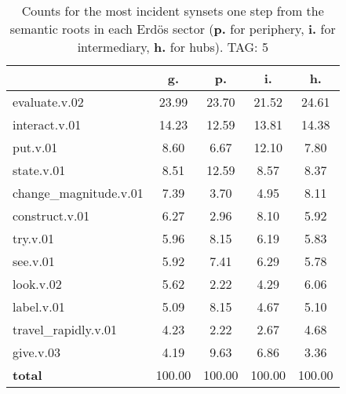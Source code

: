 \begin{table}[h!]
\begin{center}
\begin{tabular}{| l || c | c | c | c |}\hline
 & {\bf g.} & {\bf p.} & {\bf i.} & {\bf h.} \\\hline\hline
evaluate.v.02 & 23.99  & 23.70  & 21.52  & 24.61 \\\hline
interact.v.01 & 14.23  & 12.59  & 13.81  & 14.38 \\\hline
put.v.01 & 8.60  & 6.67  & 12.10  & 7.80 \\\hline
state.v.01 & 8.51  & 12.59  & 8.57  & 8.37 \\\hline
change\_magnitude.v.01 & 7.39  & 3.70  & 4.95  & 8.11 \\\hline
construct.v.01 & 6.27  & 2.96  & 8.10  & 5.92 \\\hline
try.v.01 & 5.96  & 8.15  & 6.19  & 5.83 \\\hline
see.v.01 & 5.92  & 7.41  & 6.29  & 5.78 \\\hline
look.v.02 & 5.62  & 2.22  & 4.29  & 6.06 \\\hline
label.v.01 & 5.09  & 8.15  & 4.67  & 5.10 \\\hline
travel\_rapidly.v.01 & 4.23  & 2.22  & 2.67  & 4.68 \\\hline
give.v.03 & 4.19  & 9.63  & 6.86  & 3.36 \\\hline\hline
{{\bf total}} & 100.00  & 100.00  & 100.00  & 100.00 \\\hline
\end{tabular}
\caption{Counts for the most incident synsets one step from the semantic roots in each Erd\"os sector ({\bf p.} for periphery, {\bf i.} for intermediary, {\bf h.} for hubs). TAG: 5}
\end{center}
\end{table}